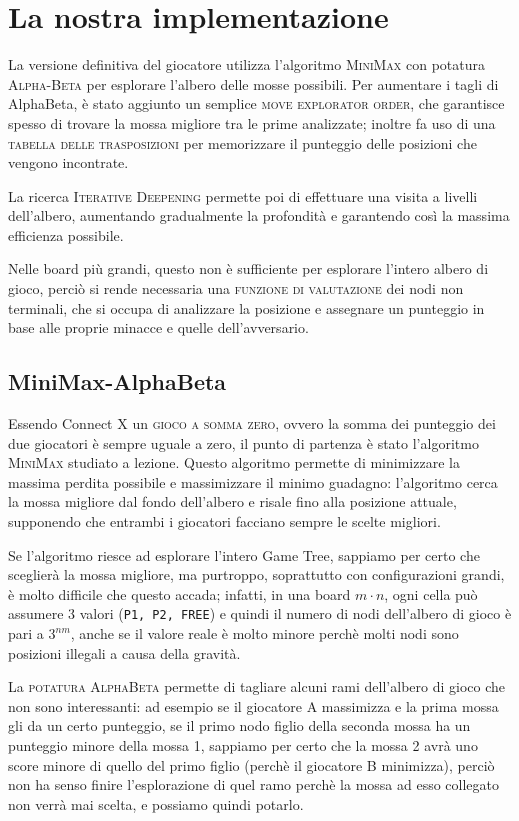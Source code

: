 \documentclass{article}
\begin{document}
\section{La nostra implementazione}

La versione definitiva del giocatore utilizza l'algoritmo \textsc{MiniMax} con 
potatura \textsc{Alpha-Beta} per esplorare l'albero delle mosse possibili.
Per aumentare i tagli di AlphaBeta, è stato aggiunto un semplice \textsc{move explorator
order}, che garantisce spesso di trovare la mossa migliore tra le prime analizzate; inoltre
fa uso di una \textsc{tabella delle trasposizioni} per memorizzare il
punteggio delle posizioni che vengono incontrate. 

La ricerca \textsc{Iterative Deepening}
permette poi di effettuare una visita a livelli dell'albero, aumentando gradualmente
la profondità e garantendo così la massima efficienza possibile.

Nelle board più grandi, questo non è sufficiente per esplorare l'intero albero di gioco,
perciò si rende necessaria una \textsc{funzione di valutazione} dei nodi non terminali, che
si occupa di analizzare la posizione e assegnare un punteggio in base alle proprie 
minacce e quelle dell'avversario.

\subsection{MiniMax-AlphaBeta}

Essendo Connect X un \textsc{gioco a somma zero}, ovvero la somma dei punteggio dei due giocatori
è sempre uguale a zero, il punto di partenza è stato l'algoritmo \textsc{MiniMax} studiato a lezione. 
Questo algoritmo permette di minimizzare la massima perdita possibile e massimizzare il minimo 
guadagno: l'algoritmo cerca la mossa migliore dal fondo dell'albero e risale fino alla posizione 
attuale, supponendo che entrambi i giocatori facciano sempre le scelte migliori.

Se l'algoritmo riesce ad esplorare l'intero Game Tree, sappiamo per certo che sceglierà la mossa 
migliore, ma purtroppo, soprattutto con configurazioni grandi, è molto difficile che questo accada; 
infatti, in una board $m \cdot n$, ogni cella può assumere 3 valori (\verb!P1, P2, FREE!) e quindi 
il numero di nodi dell'albero di gioco è pari a $3^{nm}$, anche se il valore reale è molto minore
perchè molti nodi sono posizioni illegali a causa della gravità.

La \textsc{potatura AlphaBeta} permette di tagliare alcuni rami dell'albero di gioco che non sono 
interessanti: ad esempio se il giocatore A massimizza e la prima mossa gli da un certo punteggio, se
il primo nodo figlio della seconda mossa ha un punteggio minore della mossa 1, sappiamo per certo che
la mossa 2 avrà uno score minore di quello del primo figlio (perchè il giocatore B minimizza), 
perciò non ha senso finire l'esplorazione di quel ramo perchè la mossa ad esso collegato non verrà 
mai scelta, e possiamo quindi potarlo.
\end{document}
